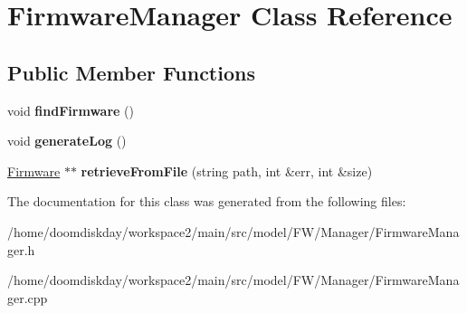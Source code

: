 \hypertarget{classFirmwareManager}{}\section{Firmware\+Manager Class Reference}
\label{classFirmwareManager}
\subsection*{Public Member Functions}
\begin{DoxyCompactItemize}
\item 
void {\bfseries find\+Firmware} ()\hypertarget{classFirmwareManager_ac342c3efab95288ed5cd58d4dc55828f}{}\label{classFirmwareManager_ac342c3efab95288ed5cd58d4dc55828f}

\item 
void {\bfseries generate\+Log} ()\hypertarget{classFirmwareManager_a521978f262cfa7ed05a37f73436ac035}{}\label{classFirmwareManager_a521978f262cfa7ed05a37f73436ac035}

\item 
\hyperlink{classFirmware}{Firmware} $\ast$$\ast$ {\bfseries retrieve\+From\+File} (string path, int \&err, int \&size)\hypertarget{classFirmwareManager_ade8c285cc39fa2730541a458cef43123}{}\label{classFirmwareManager_ade8c285cc39fa2730541a458cef43123}

\end{DoxyCompactItemize}


The documentation for this class was generated from the following files\+:\begin{DoxyCompactItemize}
\item 
/home/doomdiskday/workspace2/main/src/model/\+F\+W/\+Manager/Firmware\+Manager.\+h\item 
/home/doomdiskday/workspace2/main/src/model/\+F\+W/\+Manager/Firmware\+Manager.\+cpp\end{DoxyCompactItemize}
